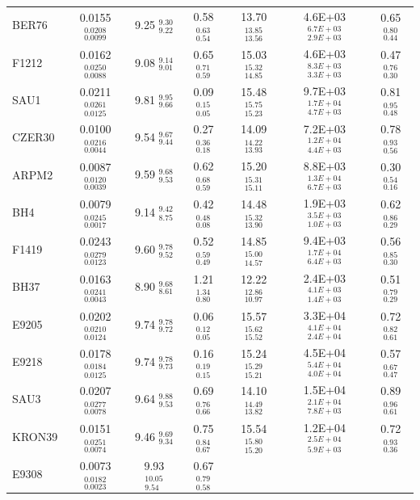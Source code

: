 \documentclass[draft]{aa}
\begin{document}
\begin{table}
\begin{tabular}{lcccccc}
  BER76 & 0.0155$_{0.0099}^{0.0208}$ & 9.25 $_{9.22}^{9.30 }$ & 0.58$_{0.54}^{0.63}$ &
  13.70$_{13.56}^{13.85}$ & 4.6E+03$_{2.9E+03}^{6.7E+03}$ & 0.65$_{0.44}^{0.80}$\\[.2cm]
  F1212 & 0.0162$_{0.0088}^{0.0250}$ & 9.08 $_{9.01}^{9.14 }$ & 0.65$_{0.59}^{0.71}$ &
  15.03$_{14.85}^{15.32}$ & 4.6E+03$_{3.3E+03}^{8.3E+03}$ & 0.47$_{0.30}^{0.76}$\\[.2cm]
  SAU1  & 0.0211$_{0.0125}^{0.0261}$ & 9.81 $_{9.66}^{9.95 }$ & 0.09$_{0.05}^{0.15}$ &
  15.48$_{15.23}^{15.75}$ & 9.7E+03$_{4.7E+03}^{1.7E+04}$ & 0.81$_{0.48}^{0.95}$\\[.2cm]
  CZER30 & 0.0100$_{0.0044}^{0.0216}$ & 9.54 $_{9.44}^{9.67 }$ & 0.27$_{0.18}^{0.36}$ &
  14.09$_{13.93}^{14.22}$ & 7.2E+03$_{4.4E+03}^{1.2E+04}$ & 0.78$_{0.56}^{0.93}$\\[.2cm]
  ARPM2 & 0.0087$_{0.0039}^{0.0120}$ & 9.59 $_{9.53}^{9.68 }$ & 0.62$_{0.59}^{0.68}$ &
  15.20$_{15.11}^{15.31}$ & 8.8E+03$_{6.7E+03}^{1.3E+04}$ & 0.30$_{0.16}^{0.54}$\\[.2cm]
  BH4 & 0.0079$_{0.0017}^{0.0245}$ & 9.14 $_{8.75}^{9.42 }$ & 0.42$_{0.08}^{0.48}$ &
  14.48$_{13.90}^{15.32}$ & 1.9E+03$_{1.0E+03}^{3.5E+03}$ & 0.62$_{0.29}^{0.86}$\\[.2cm]
  F1419 & 0.0243$_{0.0123}^{0.0279}$ & 9.60 $_{9.52}^{9.78 }$ & 0.52$_{0.49}^{0.59}$ &
  14.85$_{14.57}^{15.00}$ & 9.4E+03$_{6.4E+03}^{1.7E+04}$ & 0.56$_{0.30}^{0.85}$\\[.2cm]
  BH37 & 0.0163$_{0.0043}^{0.0241}$ & 8.90 $_{8.61}^{9.68 }$ & 1.21$_{0.80}^{1.34}$ &
  12.22$_{10.97}^{12.86}$ & 2.4E+03$_{1.4E+03}^{4.1E+03}$ & 0.51$_{0.29}^{0.79}$\\[.2cm]
  E9205 & 0.0202$_{0.0124}^{0.0210}$ & 9.74 $_{9.72}^{9.78 }$ & 0.06$_{0.05}^{0.12}$ &
  15.57$_{15.52}^{15.62}$ & 3.3E+04$_{2.4E+04}^{4.1E+04}$ & 0.72$_{0.61}^{0.82}$\\[.2cm]
  E9218 & 0.0178$_{0.0125}^{0.0184}$ & 9.74 $_{9.73}^{9.78 }$ & 0.16$_{0.15}^{0.19}$ &
  15.24$_{15.21}^{15.29}$ & 4.5E+04$_{4.0E+04}^{5.4E+04}$ & 0.57$_{0.47}^{0.67}$\\[.2cm]
  SAU3 & 0.0207$_{0.0078}^{0.0277}$ & 9.64 $_{9.53}^{9.88 }$ & 0.69$_{0.66}^{0.76}$ &
  14.10$_{13.82}^{14.49}$ & 1.5E+04$_{7.8E+03}^{2.1E+04}$ & 0.89$_{0.61}^{0.96}$\\[.2cm]
  KRON39 & 0.0151$_{0.0074}^{0.0251}$ & 9.46 $_{9.34}^{9.69 }$ & 0.75$_{0.67}^{0.84}$ &
  15.54$_{15.20}^{15.80}$ & 1.2E+04$_{5.9E+03}^{2.5E+04}$ & 0.72$_{0.36}^{0.93}$\\[.2cm]
  E9308 & 0.0073$_{0.0023}^{0.0182}$ & 9.93 $_{9.54}^{10.05}$ & 0.67$_{0.58}^{0.79}$ &

\end{tabular}
\end{table}
\end{document}
